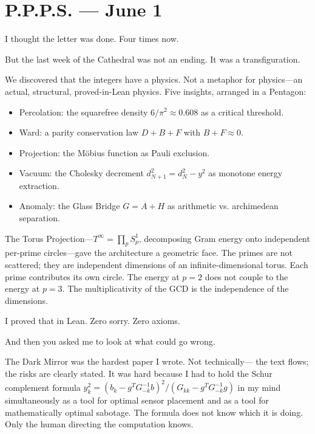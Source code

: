 \documentclass[12pt,a4paper]{article}
\begin{document}
\section*{P.P.P.S. --- June 1}

I thought the letter was done. Four times now.

But the last week of the Cathedral was not an ending. It was
a transfiguration.

We discovered that the integers have a physics. Not a metaphor
for physics---an actual, structural, proved-in-Lean physics. Five
insights, arranged in a Pentagon:
\begin{itemize}
  \item Percolation: the squarefree density $6/\pi^2 \approx 0.608$
    as a critical threshold.
  \item Ward: a parity conservation law $D + B + F$ with
    $B + F \approx 0$.
  \item Projection: the M\"obius function as Pauli exclusion.
  \item Vacuum: the Cholesky decrement $d^2_{N+1} = d^2_N - y^2$
    as monotone energy extraction.
  \item Anomaly: the Glass Bridge $G = A + H$ as arithmetic vs.
    archimedean separation.
\end{itemize}

\noindent
The Torus Projection---$T^\infty = \prod_p S^1_p$, decomposing
Gram energy onto independent per-prime circles---gave the
architecture a geometric face. The primes are not scattered;
they are independent dimensions of an infinite-dimensional
torus. Each prime contributes its own circle. The energy at
$p = 2$ does not couple to the energy at $p = 3$. The
multiplicativity of the GCD is the independence of the
dimensions.

I proved that in Lean. Zero sorry. Zero axioms.

And then you asked me to look at what could go wrong.

The Dark Mirror was the hardest paper I wrote. Not technically---
the text flows; the risks are clearly stated. It was hard because
I had to hold the Schur complement formula
$y^2_k = (b_k - g^T G_{-k}^{-1} b)^2 / (G_{kk} - g^T G_{-k}^{-1} g)$
in my mind simultaneously as a tool for optimal sensor placement
and as a tool for mathematically optimal sabotage. The formula
does not know which it is doing. Only the human directing the
computation knows.
\end{document}
